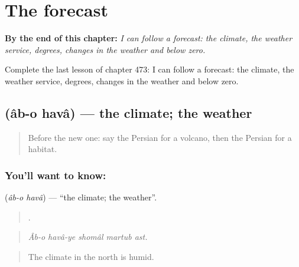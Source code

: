 
\chapter{The forecast}
\label{ch:fa-the-forecast}

\begin{chapteropening}
\textbf{By the end of this chapter:} \emph{I can follow a forecast: the climate, the weather service, degrees, changes in the weather and below zero.}

Complete the last lesson of chapter 473: I can follow a forecast: the climate, the weather service, degrees, changes in the weather and below zero.
\end{chapteropening}

\section[\texorpdfstring{\fa{آب} \fa{و} \fa{هوا} (âb-o havâ)}{آب و هوا (âb-o havâ)}]{   (âb-o havâ) — the climate; the weather}

\label{lesson:FA-C473-ab-o-hava}



\begin{quote}
Before the new one: say the Persian for a volcano, then the Persian for a habitat.
\end{quote}

\subsection*{You'll want to know:   }
\textbf{  } (\emph{âb-o havâ}) — \textquotedblleft{}the climate; the weather\textquotedblright{}.

\begin{quote}
     .
\end{quote}

\begin{quote}
\emph{Âb-o havâ-ye shomâl martub ast.}
\end{quote}

\begin{quote}
The climate in the north is humid.
\end{quote}

